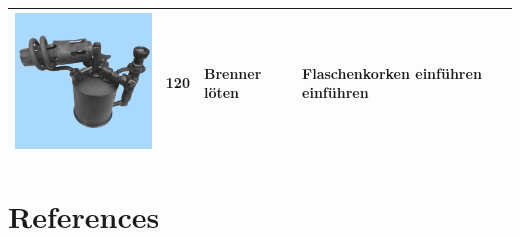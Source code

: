 \documentclass[
  english,
  man,12pt,twoside]{apa7}
\begin{document}
\begin{center}
\begin{ThreePartTable}
\begin{longtable}{llll}
\includegraphics[valign=c, scale=0.2]{../materials/unfamiliar/120.png} & 120 & Brenner löten & Flaschenkorken einführen einführen\\
\bottomrule
\end{longtable}

\end{ThreePartTable}
\end{center}

\newpage

\hypertarget{references}{%
\section{References}\label{references}}

\setlength{\parindent}{-0.5in}
\end{document}
